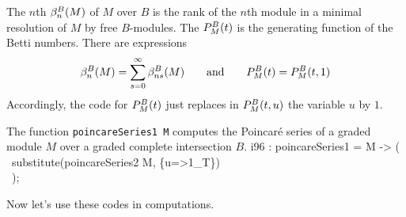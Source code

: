The $n$th {\it{}\/} $\beta^B_n(M)$ of $M$ over $B$ is the
rank of the $n$th module in a minimal resolution of $M$ by free
$B$-modules.  The {\it{}\/} ${P}^B_M(t)$ is the
generating function of the Betti numbers.  There are expressions
\[
\beta^B_n(M)=\sum_{s=0}^\infty\beta^B_{ns}(M)
\qquad\text{and}\qquad
{P}^B_M(t)={P}^B_M(t,1)
\]
Accordingly, the code for ${P}^B_M(t)$ just replaces
in ${P}^B_M(t,u)$ the variable $u$ by $1$.

\begin{sCode}
The function {\tt poincareSeries1 M} computes the Poincar\'e series of a
graded module $M$ over a graded complete intersection $B$.
\beginOutput
i96 : poincareSeries1 = M -> (\\
\         substitute(poincareSeries2 M, \{u=>1_T\})\\
\         );\\
\endOutput
\end{sCode}

Now let's use these codes in computations.

